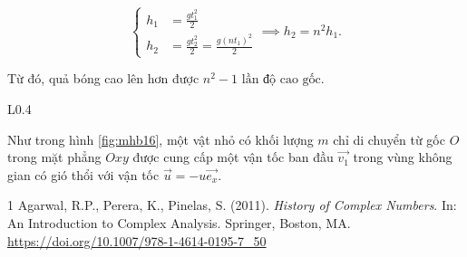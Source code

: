 \documentclass[a4paper, titlepage, openany]{book}
\newcounter{exercise}
\numberwithin{equation}{chapter}
\begin{document}
\begin{equation*}
   \begin{cases}
      h_1 &= \frac{gt_1^2}{2} \\
      h_2 &= \frac{gt_2^2}{2} = \frac{g\left(nt_1\right)^2}{2}
   \end{cases}
   \implies h_2 = n^2 h_1.
\end{equation*}

Từ đó, quả bóng cao lên hơn được $\boxed{n^2 - 1 \text{ lần độ cao gốc}}$.

\begin{wrapfigure}{L}{0.4\textwidth}
   \centering

   \caption{Hình minh họa cho bài \ref{ex:16}}
   \label{fig:mhb16}
\end{wrapfigure}

\exercise[ex:16] Như trong hình \ref{fig:mhb16}, một vật nhỏ có khối lượng $m$ chỉ di chuyển từ gốc $O$ trong mặt phẳng $Oxy$ được cung cấp một vận tốc ban đầu $\overrightarrow{v_1}$ trong vùng không gian có gió thổi với vận tốc $\vec{u} = -u \overrightarrow{e_x}$.



\begin{thebibliography}{1}
Agarwal, R.P., Perera, K., Pinelas, S. (2011). \textit{History of Complex Numbers}. In: An Introduction to Complex Analysis. Springer, Boston, MA. \url{https://doi.org/10.1007/978-1-4614-0195-7_50}
\end{thebibliography}
\end{document}
